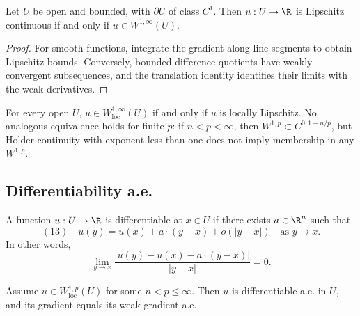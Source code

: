 \begin{theorem}
\label{thm:characterization-w1infty-lipschitz}
Let $U$ be open and bounded, with $\partial U$ of class $C^1$. Then $u : U \to \R$ is Lipschitz continuous if and only if $u \in W^{1,\infty}(U)$.
\end{theorem}

\begin{proof}
\sketch For smooth functions, integrate the gradient along line segments to obtain Lipschitz bounds. Conversely, bounded difference quotients have weakly convergent subsequences, and the translation identity identifies their limits with the weak derivatives.
\end{proof}

\begin{remark}
\label{rem:local-lipschitz-w1infty-loc-remark}
For every open $U$, $u\in W^{1,\infty}_{\mathrm{loc}}(U)$ if and only if $u$ is locally Lipschitz.
No analogous equivalence holds for finite $p$: if $n<p<\infty$, then $W^{1,p}\subset C^{0,1-n/p}$, but Holder continuity with exponent less than one does not imply membership in any $W^{1,p}$.
\end{remark}

\subsection{Differentiability a.e.}

\begin{definition}
\label{def:differentiability-at-a-point}
A function $u: U \to \R$ is differentiable at $x \in U$ if there exists $a \in \R^n$ such that
$$(13) \quad u(y) = u(x) + a \cdot (y - x) + o(|y - x|) \quad \text{as } y \to x.$$
In other words,
$$\lim_{y \to x} \frac{|u(y) - u(x) - a \cdot (y - x)|}{|y - x|} = 0.$$
\end{definition}

\begin{theorem}
\label{thm:differentiability-almost-everywhere}
Assume $u \in W^{1,p}_{\text{loc}}(U)$ for some $n < p \le \infty$. Then $u$ is differentiable a.e. in $U$, and its gradient equals its weak gradient a.e.
\end{theorem}

